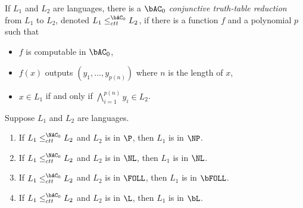 \documentclass{article}
\begin{document}
If $L_1$ and $L_2$ are languages, there is a \emph{$\bAC_0$ conjunctive truth-table reduction} from $L_1$ to $L_2$, denoted $L_1 \leq^{\bAC_0}_{ctt} L_2$, if there is a function $f$ and a polynomial $p$ such that
\begin{itemize}
\item $f$ is computable in $\bAC_0$,
\item $f(x)$ outputs $(y_1, \dotsc, y_{p(n)})$ where $n$ is the length of $x$,
\item $x \in L_1$ if and only if $\bigwedge_{i = 1}^{p(n)} y_i \in L_2$.
\end{itemize}

\begin{lemma}\label{lem:ctt}
  Suppose $L_1$ and $L_2$ are languages.
  \begin{enumerate}
  \item If $L_1 \leq^{\NAC_0}_{ctt} L_2$ and $L_2$ is in $\P$, then $L_1$ is in $\NP$.
  \item If $L_1 \leq^{\NAC_0}_{ctt} L_2$ and $L_2$ is in $\NL$, then $L_1$ is in $\NL$.
  \item If $L_1 \leq^{\bAC_0}_{ctt} L_2$ and $L_2$ is in $\FOLL$, then $L_1$ is in $\bFOLL$.
  \item If $L_1 \leq^{\bAC_0}_{ctt} L_2$ and $L_2$ is in $\L$, then $L_1$ is in $\bL$.
  \end{enumerate}
\end{lemma}
\end{document}
